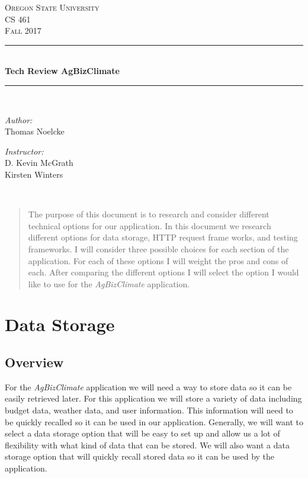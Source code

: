 \documentclass[onecolumn, draftclsnofoot,10pt, compsoc]{article}
\begin{document}
    \begin{titlepage}
    \newcommand{\HRule}{\rule{\linewidth}{0.5mm}}
    \center
    \textsc{\Large Oregon State University}\\[1.5cm]
    \textsc{\Large CS 461}\\[0.5cm]
    \textsc{\Large Fall 2017}\\[0.5cm]
    \HRule \\[0.4cm]
    { \huge \bfseries Tech Review AgBizClimate\textcopyright}\\[0.4cm] %
    \HRule \\[1.5cm]
    \begin{minipage}{0.4\textwidth}
        \begin{flushleft} \large
        \emph{Author:}\\
        Thomas Noelcke
        \end{flushleft}
    \end{minipage}
    \begin{minipage}{0.4\textwidth}
        \begin{flushright} \large
        \emph{Instructor:} \\
        D. Kevin McGrath\\
        Kirsten Winters
        \end{flushright}
    \end{minipage}\\[2cm]
    \begin{abstract}
    \item 
		The purpose of this document is to research and consider different technical options for our application. In this document we research different options for data storage, HTTP request frame works, and testing frameworks. I will consider three possible choices for each section of the application. For each of these options I will weight the pros and cons of each. After comparing the different options I will select the option I would like to use for the \textit{AgBizClimate} application.
    \end{abstract}
    \vfill %
    \end{titlepage}
		\newpage
		\tableofcontents
		\newpage
		\clearpage
		
\section{Data Storage}
	\subsection{Overview}
		For the \textit{AgBizClimate} application we will need a way to store data so it can be easily retrieved later. For this application we will store a variety of data including budget data, weather data, and user information. This information will need to be quickly recalled so it can be used in our application. Generally, we will want to select a data storage option that will be easy to set up and allow us a lot of flexibility with what kind of data that can be stored. We will also want a data storage option that will quickly recall stored data so it can be used by the application.\\
\end{document}
